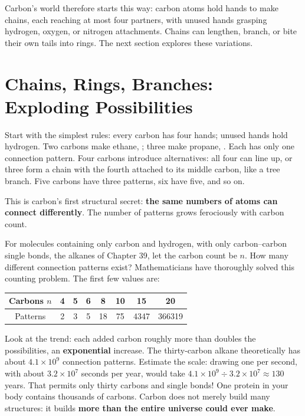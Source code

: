 Carbon's world therefore starts this way: carbon atoms hold hands to make chains, each reaching at most four partners, with unused hands grasping hydrogen, oxygen, or nitrogen attachments. Chains can lengthen, branch, or bite their own tails into rings. The next section explores these variations.

\section{Chains, Rings, Branches: Exploding Possibilities}

Start with the simplest rules: every carbon has four hands; unused hands hold hydrogen. Two carbons make ethane, ; three make propane, . Each has only one connection pattern. Four carbons introduce alternatives: all four can line up, or three form a chain with the fourth attached to its middle carbon, like a tree branch. Five carbons have three patterns, six have five, and so on.

This is carbon's first structural secret: \textbf{the same numbers of atoms can connect differently}. The number of patterns grows ferociously with carbon count.

\begin{qiaoliang}
For molecules containing only carbon and hydrogen, with only carbon--carbon single bonds, the alkanes of Chapter 39, let the carbon count be $n$. How many different connection patterns exist? Mathematicians have thoroughly solved this counting problem. The first few values are:

\begin{center}
\begin{tabular}{cccccccc}
\toprule
Carbons $n$ & 4 & 5 & 6 & 8 & 10 & 15 & 20 \\
\midrule
Patterns & 2 & 3 & 5 & 18 & 75 & 4347 & 366319 \\
\bottomrule
\end{tabular}
\end{center}

Look at the trend: each added carbon roughly more than doubles the possibilities, an \textbf{exponential} increase. The thirty-carbon alkane  theoretically has about $4.1\times 10^{9}$ connection patterns. Estimate the scale: drawing one per second, with about $3.2\times 10^{7}$ seconds per year, would take $4.1\times 10^{9}\div 3.2\times 10^{7}\approx 130$ years. That permits only thirty carbons and single bonds! One protein in your body contains thousands of carbons. Carbon does not merely build many structures: it builds \textbf{more than the entire universe could ever make}.
\end{qiaoliang}

